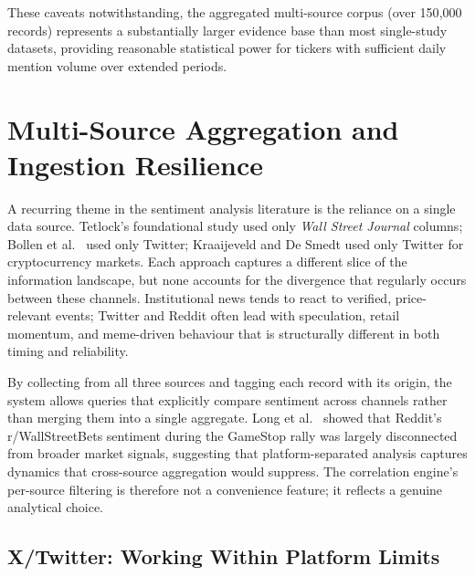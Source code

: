 These caveats notwithstanding, the aggregated multi-source corpus (over 150{,}000 records) represents a substantially larger evidence base than most single-study datasets, providing reasonable statistical power for tickers with sufficient daily mention volume over extended periods.

\section{Multi-Source Aggregation and Ingestion Resilience}

A recurring theme in the sentiment analysis literature is the reliance on a single data source.
Tetlock's foundational study \citep{tetlock2007giving} used only \textit{Wall Street Journal} columns; Bollen et al.\ \citep{bollen2011twitter} used only Twitter; Kraaijeveld and De Smedt \citep{kraaijeveld2020predictive} used only Twitter for cryptocurrency markets.
Each approach captures a different slice of the information landscape, but none accounts for the divergence that regularly occurs between these channels.
Institutional news tends to react to verified, price-relevant events; Twitter and Reddit often lead with speculation, retail momentum, and meme-driven behaviour that is structurally different in both timing and reliability.

By collecting from all three sources and tagging each record with its origin, the system allows queries that explicitly compare sentiment across channels rather than merging them into a single aggregate.
Long et al.\ \citep{long2023reddit} showed that Reddit's r/WallStreetBets sentiment during the GameStop rally was largely disconnected from broader market signals, suggesting that platform-separated analysis captures dynamics that cross-source aggregation would suppress.
The correlation engine's per-source filtering is therefore not a convenience feature; it reflects a genuine analytical choice.

\subsection{X/Twitter: Working Within Platform Limits}
\label{sec:twitter_reflection}

